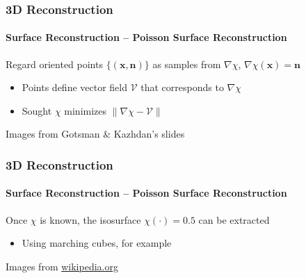 \documentclass[xetex,professionalfont]{beamer}
\renewcommand{\vec}[1]{\ensuremath{\mathbf{#1}}}
\newcommand{\vx}{\vec{x}}
\newcommand{\vn}{\vec{n}}
\begin{document}

\begin{frame}
\frametitle{3D Reconstruction}
\framesubtitle{Surface Reconstruction -- Poisson Surface Reconstruction}

Regard oriented points $\{(\vx,\vn)\}$ as samples from $\nabla\chi$, $\nabla\chi(\vx)=\vn$ %
\begin{itemize}
    \item Points define vector field $\mathcal{V}$ that corresponds to $\nabla\chi$ %
    \item Sought $\chi$ minimizes $\lVert\nabla\chi-\mathcal{V}\rVert$ %
\end{itemize}

\bigskip
\begin{center}
    {\centering Images from Gotsman \& Kazhdan's slides}
\end{center}

\end{frame}


\begin{frame}
\frametitle{3D Reconstruction}
\framesubtitle{Surface Reconstruction -- Poisson Surface Reconstruction}

Once $\chi$ is known, the isosurface $\chi(\cdot)=0.5$ can be extracted
\begin{itemize}
    \item Using marching cubes, for example %
\end{itemize}

\bigskip
\begin{center}
    {\centering Images from \url{wikipedia.org}}
\end{center}

\end{frame}
\end{document}
